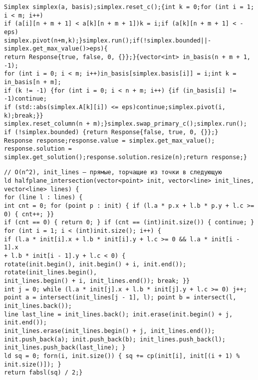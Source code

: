 \documentclass[12pt]{article}
\begin{document}
\begin{verbatim}
Simplex simplex(a, basis);simplex.reset_c();{int k = 0;for (int i = 1; i < m; i++)
if (a[i][n + m + 1] < a[k][n + m + 1])k = i;if (a[k][n + m + 1] < -eps)
simplex.pivot(n+m,k);}simplex.run();if(!simplex.bounded||-simplex.get_max_value()>eps){
return Response{true, false, 0, {}};}{vector<int> in_basis(n + m + 1, -1);
for (int i = 0; i < m; i++)in_basis[simplex.basis[i]] = i;int k = in_basis[n + m];
if (k != -1) {for (int i = 0; i < n + m; i++) {if (in_basis[i] != -1)continue;
if (std::abs(simplex.A[k][i]) <= eps)continue;simplex.pivot(i, k);break;}}
simplex.reset_column(n + m);}simplex.swap_primary_c();simplex.run();
if (!simplex.bounded) {return Response{false, true, 0, {}};}
Response response;response.value = simplex.get_max_value();
response.solution = simplex.get_solution();response.solution.resize(n);return response;}
\end{verbatim}

\begin{verbatim}
// O(n^2), init_lines — прямые, торчащие из точки в следующую
ld halfplane_intersection(vector<point> init, vector<line> init_lines, vector<line> lines) {
for (line l : lines) {
int cnt = 0; for (point p : init) { if (l.a * p.x + l.b * p.y + l.c >= 0) { cnt++; }}
if (cnt == 0) { return 0; } if (cnt == (int)init.size()) { continue; }
for (int i = 1; i < (int)init.size(); i++) {
if (l.a * init[i].x + l.b * init[i].y + l.c >= 0 && l.a * init[i - 1].x
+ l.b * init[i - 1].y + l.c < 0) {
rotate(init.begin(), init.begin() + i, init.end()); rotate(init_lines.begin(), 
init_lines.begin() + i, init_lines.end()); break; }}
int j = 0; while (l.a * init[j].x + l.b * init[j].y + l.c >= 0) j++;
point a = intersect(init_lines[j - 1], l); point b = intersect(l, init_lines.back());
line last_line = init_lines.back(); init.erase(init.begin() + j, init.end());
init_lines.erase(init_lines.begin() + j, init_lines.end());
init.push_back(a); init.push_back(b); init_lines.push_back(l);
init_lines.push_back(last_line); }
ld sq = 0; forn(i, init.size()) { sq += cp(init[i], init[(i + 1) % init.size()]); }
return fabsl(sq) / 2;}
\end{verbatim}


\end{document}
